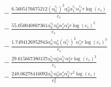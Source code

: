 \documentclass[10pt]{article}
\begin{document}
\begin{align*}
&{}  - \frac{6.5605176675212 \left(\alpha_{0}^{c_s}\right)^{2} \alpha_{0}^s \alpha_{1}^{c_s} \alpha_{2}^{c_s} r \log{\left(c_{s} \right)}}{c_{s}} \\
&{}  - \frac{55.050040867361 \alpha_{0}^{c_s} \alpha_{0}^s \alpha_{1}^s \alpha_{3}^s r \log{\left(c_{s} \right)}^{2}}{c_{s}} \\
&{}  - \frac{1.7494126952943 \alpha_{0}^{c_s} \alpha_{0}^s \left(\alpha_{1}^{c_s}\right)^{2} \alpha_{1}^s r \log{\left(c_{s} \right)}^{3}}{c_{s}} \\
&{}  - \frac{29.615667380137 \alpha_{0}^{c_s} \alpha_{0}^s \alpha_{2}^{c_s} \alpha_{2}^s r \log{\left(c_{s} \right)}^{2}}{c_{s}} \\
&{}  - \frac{248.06278416092 \alpha_{0}^{c_s} \alpha_{0}^s \alpha_{1}^s \alpha_{2}^{c_s} r^{2} \log{\left(c_{s} \right)}}{c_{s}^{2}}
\end{align*}
\end{document}

